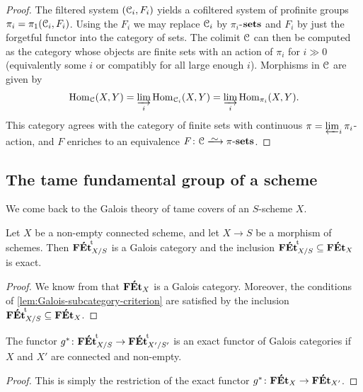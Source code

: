 \begin{proof}
    The filtered system $({\mathcal C}_i,F_i)$ yields a cofiltered system of profinite groups 
    $\pi_i = \pi_1({\mathcal C}_i,F_i)$. Using the $F_i$ we may replace ${\mathcal C}_i$ by $\pi_i$-$\mathbf{sets}$ and $F_i$ by just the forgetful functor into the category of sets. The colimit ${\mathcal C}$ can then be computed as the category whose objects are finite sets with an action of $\pi_i$ for $i \gg 0$ (equivalently some $i$ or compatibly for all large enough $i$). Morphisms in ${\mathcal C}$ are given by 
    \[
    \operatorname{Hom}_{{\mathcal C}}(X,Y) = \varinjlim_i \operatorname{Hom}_{{\mathcal C}_i}(X,Y)= \varinjlim_i \operatorname{Hom}_{\pi_i}(X,Y).
    \]
    This category agrees with the category of finite sets with continuous $\pi = \varprojlim_i \pi_i$-action, and $F$ enriches to an equivalence $F \colon \cC \isomto \pi\text{-}\sets$.  
\end{proof}


\subsection{The tame fundamental group of a scheme}
\label{sec:tame pi1}

We come back to the Galois theory of tame covers of an $S$-scheme $X$.

\begin{prop}
\label{prop:Fett is Galois for schemes}
    Let $X$ be a non-empty connected scheme, and let $X\to S$ be a morphism of schemes. Then ${\mathbf{F\acute{E}t}}^{\!\mathrm{t}}_{X/S}$ is a Galois category and the inclusion ${\mathbf{F\acute{E}t}}^{\!\mathrm{t}}_{X/S} \subseteq \mathbf{F\acute{E}t}_X$ is exact.
\end{prop}

\begin{proof}
We know from  that $\mathbf{F\acute{E}t}_X$ is a Galois category. Moreover, the conditions of \cref{lem:Galois-subcategory-criterion} are satisfied by the inclusion ${\mathbf{F\acute{E}t}}^{\!\mathrm{t}}_{X/S}\subseteq \mathbf{F\acute{E}t}_X$. 
\end{proof}

\begin{cor}
\label{cor:exact functor tame covers}
    The functor $g^\ast \colon {\mathbf{F\acute{E}t}}^{\!\mathrm{t}}_{X/S} \to {\mathbf{F\acute{E}t}}^{\!\mathrm{t}}_{X'/S'}$  
    is an exact functor of Galois categories if $X$ and $X'$ are connected and non-empty.
\end{cor}

\begin{proof}
    This is simply the restriction of the exact functor $g^\ast \colon \mathbf{F\acute{E}t}_X \to \mathbf{F\acute{E}t}_{X'}$.
\end{proof}


